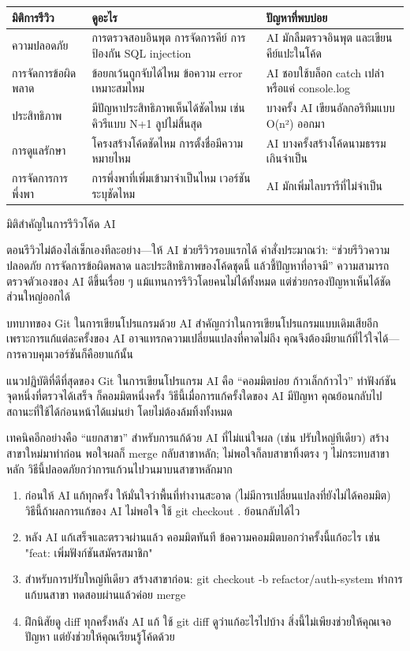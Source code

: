 \begin{center}
\begin{tabularx}{\linewidth}{|X|X|X|}
\hline
\textbf{มิติการรีวิว} & \textbf{ดูอะไร} & \textbf{ปัญหาที่พบบ่อย} \tabularnewline
\hline
ความปลอดภัย & การตรวจสอบอินพุต การจัดการคีย์ การป้องกัน SQL injection & AI มักลืมตรวจอินพุต และเขียนคีย์แปะในโค้ด \tabularnewline
การจัดการข้อผิดพลาด & ข้อยกเว้นถูกจับได้ไหม ข้อความ error เหมาะสมไหม & AI ชอบใช้บล็อก catch เปล่า หรือแค่ console.log \tabularnewline
ประสิทธิภาพ & มีปัญหาประสิทธิภาพเห็นได้ชัดไหม เช่น คิวรีแบบ N+1 ลูปไม่สิ้นสุด & บางครั้ง AI เขียนอัลกอริทึมแบบ O(n²) ออกมา \tabularnewline
การดูแลรักษา & โครงสร้างโค้ดชัดไหม การตั้งชื่อมีความหมายไหม & AI บางครั้งสร้างโค้ดนามธรรมเกินจำเป็น \tabularnewline
การจัดการการพึ่งพา & การพึ่งพาที่เพิ่มเข้ามาจำเป็นไหม เวอร์ชันระบุชัดไหม & AI มักเพิ่มไลบรารีที่ไม่จำเป็น \tabularnewline
\hline
\end{tabularx}
\end{center}

\begin{center}\small\color{gray}มิติสำคัญในการรีวิวโค้ด AI\end{center}

ตอนรีวิวไม่ต้องไล่เช็กเองทีละอย่าง—ให้ AI ช่วยรีวิวรอบแรกได้ คำสั่งประมาณว่า: “ช่วยรีวิวความปลอดภัย การจัดการข้อผิดพลาด และประสิทธิภาพของโค้ดชุดนี้ แล้วชี้ปัญหาที่อาจมี” ความสามารถตรวจตัวเองของ AI ดีขึ้นเรื่อย ๆ แม้แทนการรีวิวโดยคนไม่ได้ทั้งหมด แต่ช่วยกรองปัญหาเห็นได้ชัดส่วนใหญ่ออกได้


บทบาทของ Git ในการเขียนโปรแกรมด้วย AI สำคัญกว่าในการเขียนโปรแกรมแบบเดิมเสียอีก เพราะการแก้แต่ละครั้งของ AI อาจแทรกความเปลี่ยนแปลงที่คาดไม่ถึง คุณจึงต้องมียาแก้ที่ไว้ใจได้—การควบคุมเวอร์ชันก็คือยาแก้นั้น

แนวปฏิบัติที่ดีที่สุดของ Git ในการเขียนโปรแกรม AI คือ “คอมมิตบ่อย ก้าวเล็กก้าวไว” ทำฟังก์ชันจุดหนึ่งที่ตรวจได้เสร็จ ก็คอมมิตหนึ่งครั้ง วิธีนี้เมื่อการแก้ครั้งใดของ AI มีปัญหา คุณย้อนกลับไปสถานะที่ใช้ได้ก่อนหน้าได้แม่นยำ โดยไม่ต้องล้มทิ้งทั้งหมด

เทคนิคอีกอย่างคือ “แยกสาขา” สำหรับการแก้ด้วย AI ที่ไม่แน่ใจผล (เช่น ปรับใหญ่ทีเดียว) สร้างสาขาใหม่มาทำก่อน พอใจผลก็ merge กลับสาขาหลัก; ไม่พอใจก็ลบสาขาทิ้งตรง ๆ ไม่กระทบสาขาหลัก วิธีนี้ปลอดภัยกว่าการแก้วนไปวนมาบนสาขาหลักมาก

\begin{enumerate}
  \item ก่อนให้ AI แก้ทุกครั้ง ให้มั่นใจว่าพื้นที่ทำงานสะอาด (ไม่มีการเปลี่ยนแปลงที่ยังไม่ได้คอมมิต) วิธีนี้ถ้าผลการแก้ของ AI ไม่พอใจ ใช้ git checkout . ย้อนกลับได้ไว
  \item หลัง AI แก้เสร็จและตรวจผ่านแล้ว คอมมิตทันที ข้อความคอมมิตบอกว่าครั้งนี้แก้อะไร เช่น "feat: เพิ่มฟังก์ชันสมัครสมาชิก"
  \item สำหรับการปรับใหญ่ทีเดียว สร้างสาขาก่อน: git checkout -b refactor/auth-system ทำการแก้บนสาขา ทดสอบผ่านแล้วค่อย merge
  \item ฝึกนิสัยดู diff ทุกครั้งหลัง AI แก้ ใช้ git diff ดูว่าแก้อะไรไปบ้าง สิ่งนี้ไม่เพียงช่วยให้คุณเจอปัญหา แต่ยังช่วยให้คุณเรียนรู้โค้ดด้วย
\end{enumerate}

